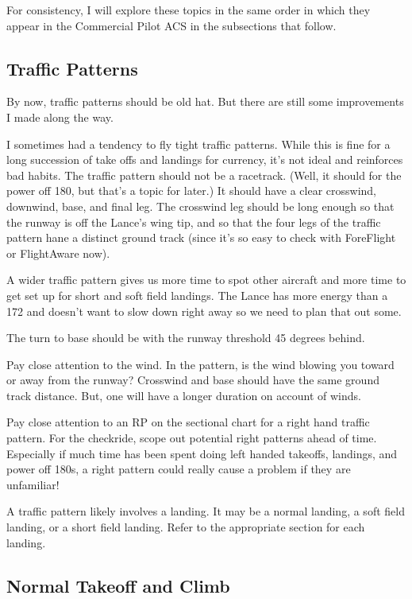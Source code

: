 For consistency, I will explore these topics in the same order in which they appear in the Commercial Pilot ACS in the subsections that follow.

\subsection{Traffic Patterns}

By now, traffic patterns should be old hat. But there are still some improvements I made along the way.

I sometimes had a tendency to fly tight traffic patterns. While this is fine for a long succession of take offs and landings for currency, it's not ideal and reinforces bad habits. The traffic pattern should not be a racetrack. (Well, it should for the power off 180, but that's a topic for later.) It should have a clear crosswind, downwind, base, and final leg. The crosswind leg should be long enough so that the runway is off the Lance's wing tip, and so that the four legs of the traffic pattern hane a distinct ground track (since it's so easy to check with ForeFlight or FlightAware now).

A wider traffic pattern gives us more time to spot other aircraft and more time to get set up for short and soft field landings. The Lance has more energy than a 172 and doesn't want to slow down right away so we need to plan that out some.

The turn to base should be with the runway threshold 45 degrees behind.

Pay close attention to the wind. In the pattern, is the wind blowing you toward or away from the runway? Crosswind and base should have the same ground track distance. But, one will have a longer duration on account of winds.

Pay close attention to an RP on the sectional chart for a right hand traffic pattern. For the checkride, scope out potential right patterns ahead of time. Especially if much time has been spent doing left handed takeoffs, landings, and power off 180s, a right pattern could really cause a problem if they are unfamiliar!

A traffic pattern likely involves a landing. It may be a normal landing, a soft field landing, or a short field landing. Refer to the appropriate section for each landing.

\subsection{Normal Takeoff and Climb}

